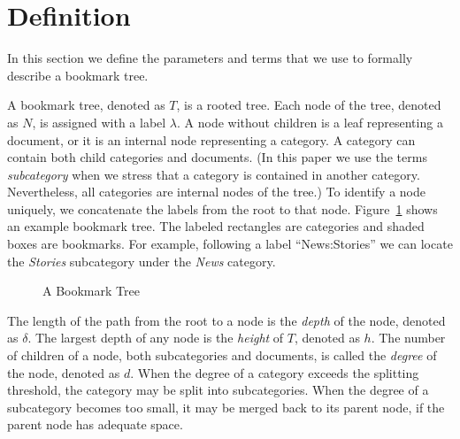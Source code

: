 \section{Definition}

In this section we define the parameters and terms
that we use to formally describe a bookmark tree.

A bookmark tree, denoted as $T$, is a rooted tree. Each node 
of the tree, denoted as $N$, is
assigned with a label $\lambda$. 
A node without children is a leaf representing a document,
or it is an internal node representing a category. 
A category can contain both child categories and documents.
(In this paper we use the terms
{\it subcategory} when we stress that
a category is contained in another category. Nevertheless, 
all categories are internal nodes of the tree.)
To identify a node uniquely,
we concatenate the labels from the root to that node.
Figure~\ref{fig-labels} shows an example bookmark tree.
The labeled rectangles are categories and shaded
boxes are bookmarks. For example, following a 
label ``News:Stories'' we can locate the 
{\it Stories} subcategory under the {\it News} category.

\begin{figure}[t]
\epsfysize=180pt
\epsfxsize=320pt
\centerline{}
\caption{A Bookmark Tree}
\label{fig-labels}
\end{figure}

The length of the path from the root to a node is the {\it depth}
of the node, denoted as $\delta$. 
The largest depth of any node is the {\it height}
of $T$, denoted as $h$. The number of children of a node,
both subcategories and documents, is 
called the {\it degree} of the node, denoted as $d$. 
When the degree of a category exceeds the splitting
threshold, the category may be split into subcategories.
When the degree of a subcategory becomes too small,
it may be merged back to its parent node, if the
parent node has adequate space. 


